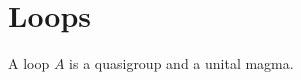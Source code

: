 

\section{Loops}

\begin{struct}\label{loop}
    A loop $A$ is a quasigroup and a unital magma.
\end{struct}
